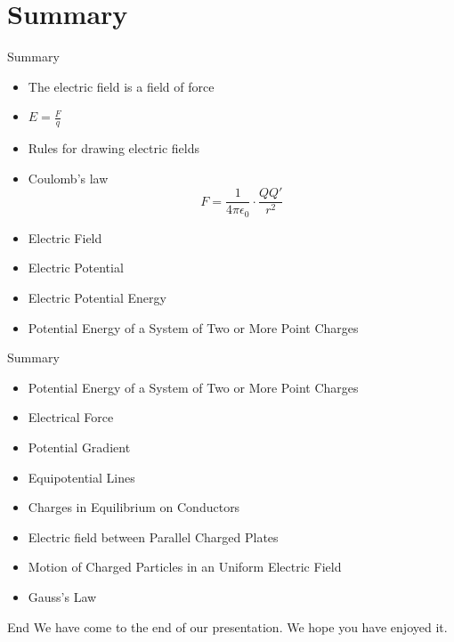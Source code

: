 \documentclass{beamer}
\begin{document}
\section*{Summary}

\begin{frame}{Summary}
  \begin{itemize}
  \item The electric field is a field of force
  \item \(E=\frac{F}{q}\)
  \item Rules for drawing electric fields
  \item Coulomb's law
  \[F=\frac{1}{4\pi \epsilon_0} \cdot \frac{QQ\prime}{r^2} \]
  \item Electric Field
  \item Electric Potential
  \item Electric Potential Energy
  \item Potential Energy of a System of Two or More Point Charges
  \end{itemize}
\end{frame}

\begin{frame}{Summary}
  \begin{itemize}
  \item Potential Energy of a System of Two or More Point Charges
  \item Electrical Force
  \item Potential Gradient
  \item Equipotential Lines
  \item Charges in Equilibrium on Conductors
  \item Electric field between Parallel Charged Plates
  \item Motion of Charged Particles in an Uniform Electric Field
  \item Gauss's Law
  \end{itemize}
\end{frame}

\begin{frame}{End}
We have come to the end of our presentation. We hope you have enjoyed it.
\end{frame}
\end{document}
